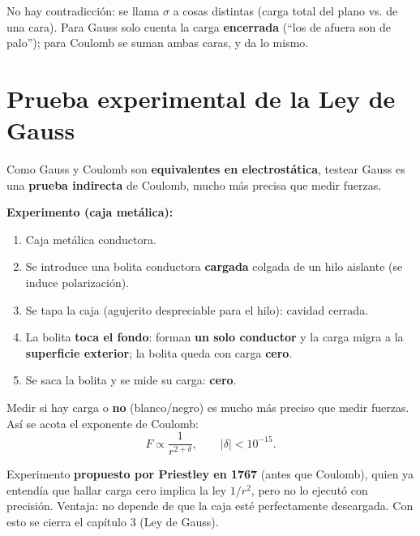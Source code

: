 \documentclass[12pt,a4paper]{article}
\begin{document}


\begin{keybox}
  No hay contradicción: se llama $\sigma$ a cosas distintas (carga total
  del plano vs. de una cara). Para Gauss solo cuenta la carga
  \textbf{encerrada} (\enquote{los de afuera son de palo}); para Coulomb
  se suman ambas caras, y da lo mismo.
\end{keybox}

\section{Prueba experimental de la Ley de Gauss}

Como Gauss y Coulomb son \textbf{equivalentes en electrostática},
testear Gauss es una \textbf{prueba indirecta} de Coulomb, mucho más
precisa que medir fuerzas.

\textbf{Experimento (caja metálica):}
\begin{enumerate}[nosep]
  \item Caja metálica conductora.
  \item Se introduce una bolita conductora \textbf{cargada} colgada de
        un hilo aislante (se induce polarización).
  \item Se tapa la caja (agujerito despreciable para el hilo): cavidad
        cerrada.
  \item La bolita \textbf{toca el fondo}: forman \textbf{un solo
        conductor} y la carga migra a la \textbf{superficie exterior};
        la bolita queda con carga \textbf{cero}.
  \item Se saca la bolita y se mide su carga: \textbf{cero}.
\end{enumerate}



\begin{keybox}
  Medir si hay carga o \textbf{no} (blanco/negro) es mucho más preciso
  que medir fuerzas. Así se acota el exponente de Coulomb:
  \[
  F \propto \frac{1}{r^{2+\delta}}, \qquad |\delta| < 10^{-15}.
  \]
\end{keybox}

\begin{notebox}[Historia]
  Experimento \textbf{propuesto por Priestley en 1767} (antes que
  Coulomb), quien ya entendía que hallar carga cero implica la ley
  $1/r^{2}$, pero no lo ejecutó con precisión. Ventaja: no depende de
  que la caja esté perfectamente descargada. Con esto se cierra el
  capítulo 3 (Ley de Gauss).
\end{notebox}
\end{document}
